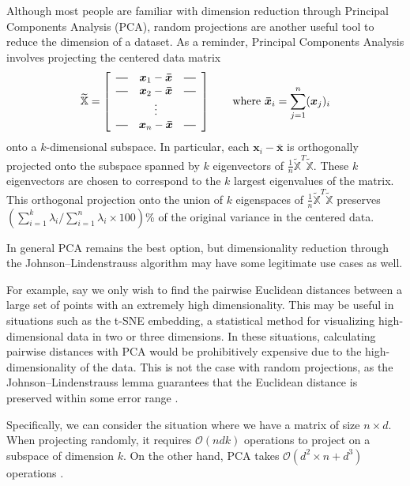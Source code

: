 \documentclass{article}
\newcommand*{\horzbar}{\rule[.5ex]{2.5ex}{0.5pt}}
\begin{document}
Although most people are familiar with dimension reduction through Principal Components Analysis (PCA), random projections are another useful tool to reduce the dimension of a dataset. As a reminder, Principal Components Analysis involves projecting the centered data matrix
\begin{align*}
\widetilde{\mathbb{X}} = 
        \left[
            \begin{array}{ccc}
            \horzbar & \boldsymbol{x}_1 - \boldsymbol{\bar{x}} & \horzbar \\
            \horzbar & \boldsymbol{x}_2 - \boldsymbol{\bar{x}} & \horzbar \\
            & \vdots &  \\
            \horzbar & \boldsymbol{x}_n - \boldsymbol{\bar{x}} & \horzbar
            \end{array}
        \right] \qquad \text{where} \ \boldsymbol{\bar{x}}_i = \sum_{j=1}^n (\boldsymbol{x}_j)_i
\end{align*}
onto a $k$-dimensional subspace. In particular, each $\boldsymbol{x}_i - \boldsymbol{\bar{x}}$ is orthogonally projected onto the subspace spanned by $k$ eigenvectors of $\frac{1}{n}\widetilde{\mathbb{X}}^T\widetilde{\mathbb{X}}$. These $k$ eigenvectors are chosen to correspond to the $k$ largest eigenvalues of the matrix. This orthogonal projection onto the union of $k$ eigenspaces of $\frac{1}{n}\widetilde{\mathbb{X}}^T\widetilde{\mathbb{X}}$ preserves $(\sum_{i=1}^k \lambda_i/\sum_{i=1}^n \lambda_i \times 100)$\% of the original variance in the centered data.   

In general PCA remains the best option, but dimensionality reduction through the Johnson–Lindenstrauss algorithm may have some legitimate use cases as well.

For example, say we only wish to find the pairwise Euclidean distances between a large set of points with an extremely high dimensionality. This may be useful in situations such as the t-SNE embedding, a statistical method for visualizing high-dimensional data in two or three dimensions. In these situations, calculating pairwise distances with PCA would be prohibitively expensive due to the high-dimensionality of the data. This is not the case with random projections, as the Johnson–Lindenstrauss lemma guarantees that the Euclidean distance is preserved within some error range \cite{stackoverflowpca}.

Specifically, we can consider the situation where we have a matrix of size $n \times d$. When projecting randomly, it requires $\mathcal{O}(ndk)$ operations to project on a subspace of dimension $k$. On the other hand, PCA takes $\mathcal{O}(d^2 \times n+d^3)$ operations \cite{stackoverflowpca}.
\end{document}
